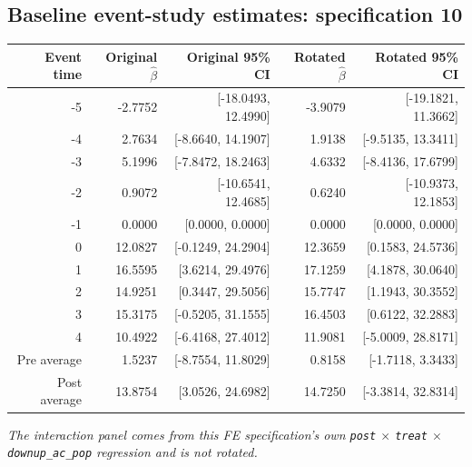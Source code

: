 \documentclass[10pt]{article}
\begin{document}
\subsection*{Baseline event-study estimates: specification 10}
\begin{center}
\scriptsize
\begin{tabular}{r rr rr}
\toprule
Event time & Original $\hat\beta$ & Original 95\% CI & Rotated $\hat\beta$ & Rotated 95\% CI \\
\midrule
-5 & -2.7752 & [-18.0493, 12.4990] & -3.9079 & [-19.1821, 11.3662] \\
-4 & 2.7634 & [-8.6640, 14.1907] & 1.9138 & [-9.5135, 13.3411] \\
-3 & 5.1996 & [-7.8472, 18.2463] & 4.6332 & [-8.4136, 17.6799] \\
-2 & 0.9072 & [-10.6541, 12.4685] & 0.6240 & [-10.9373, 12.1853] \\
-1 & 0.0000 & [0.0000, 0.0000] & 0.0000 & [0.0000, 0.0000] \\
0 & 12.0827 & [-0.1249, 24.2904] & 12.3659 & [0.1583, 24.5736] \\
1 & 16.5595 & [3.6214, 29.4976] & 17.1259 & [4.1878, 30.0640] \\
2 & 14.9251 & [0.3447, 29.5056] & 15.7747 & [1.1943, 30.3552] \\
3 & 15.3175 & [-0.5205, 31.1555] & 16.4503 & [0.6122, 32.2883] \\
4 & 10.4922 & [-6.4168, 27.4012] & 11.9081 & [-5.0009, 28.8171] \\
\midrule
Pre average & 1.5237 & [-8.7554, 11.8029] & 0.8158 & [-1.7118, 3.3433] \\
Post average & 13.8754 & [3.0526, 24.6982] & 14.7250 & [-3.3814, 32.8314] \\
\bottomrule
\end{tabular}
\end{center}
\medskip
\textit{The interaction panel comes from this FE specification's own \texttt{post} $\times$ \texttt{treat} $\times$ \texttt{downup\_ac\_pop} regression and is not rotated.}
\clearpage
\end{document}
